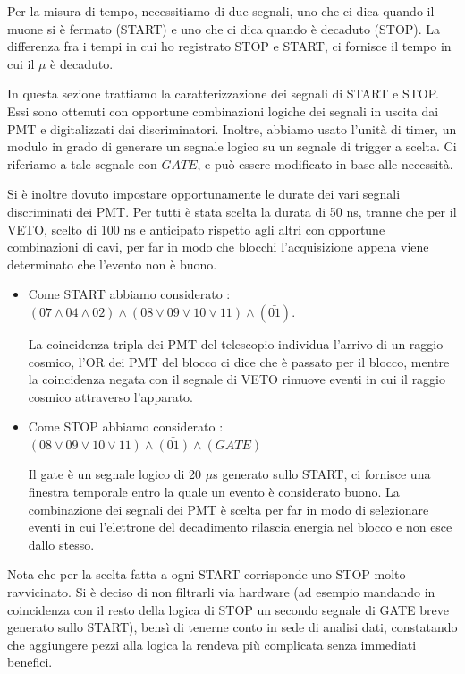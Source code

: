 \documentclass[10pt,a4paper]{article}
\begin{document}
Per la misura di tempo, necessitiamo di due segnali, uno che ci dica quando il muone si è fermato (START) e uno che ci dica quando è decaduto (STOP). La differenza fra i tempi in cui ho registrato STOP e START, ci fornisce il tempo in cui il $\mu$ è decaduto.

In questa sezione trattiamo la caratterizzazione dei segnali di START e STOP. Essi sono ottenuti con opportune combinazioni logiche dei segnali in uscita dai PMT e digitalizzati dai discriminatori. Inoltre, abbiamo usato l'unità di timer, un modulo in grado di generare un segnale logico su un segnale di trigger a scelta. Ci riferiamo a tale segnale con $GATE$, e può essere modificato in base alle necessità.

Si è inoltre dovuto impostare opportunamente le durate dei vari segnali discriminati dei PMT. Per tutti è stata scelta la durata di 50 ns, tranne che per il VETO, scelto di 100 ns e anticipato rispetto agli altri con opportune combinazioni di cavi, per far in modo che blocchi l'acquisizione appena viene determinato che l'evento non è buono. 


\begin{itemize}

\item Come START abbiamo considerato : $(07\land04\land02)\land(08\lor09\lor10\lor11)\land (\bar{01})$.

La coincidenza tripla dei PMT del telescopio individua l'arrivo di un raggio cosmico, l'OR dei PMT del blocco ci dice che è passato per il blocco, mentre la coincidenza negata con il segnale di VETO rimuove eventi in cui il raggio cosmico attraverso l'apparato.

\item Come STOP abbiamo considerato : 
$(08\lor09\lor10\lor11)\land\bar{(01)}\land(GATE)$

Il gate è un segnale logico di 20 $\mu$s generato sullo START, ci fornisce una finestra temporale entro la quale un evento è considerato buono. La combinazione dei segnali dei PMT è scelta per far in modo di selezionare eventi in cui l'elettrone del decadimento rilascia energia nel blocco e non esce dallo stesso.

\end{itemize}

Nota che per la scelta fatta a ogni START corrisponde uno STOP molto ravvicinato. Si è deciso di non filtrarli via hardware (ad esempio mandando in coincidenza con il resto della logica di STOP un secondo segnale di GATE breve generato sullo START), bensì di tenerne conto in sede di analisi dati, constatando che aggiungere pezzi alla logica la rendeva più complicata senza immediati benefici.
\end{document}
